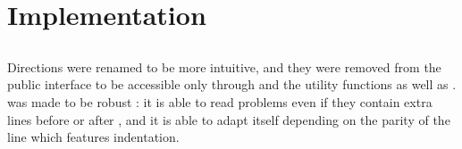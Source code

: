 \section{Implementation}


\subsection{}

Directions were renamed to be more intuitive, and they were removed
from the public interface to be accessible only through 
and the utility functions  as well as .\\

 was made to be robust : it is able to read problems even
if they contain extra lines before  or after ,
and it is able to adapt itself depending on the parity of the line which
features indentation.


